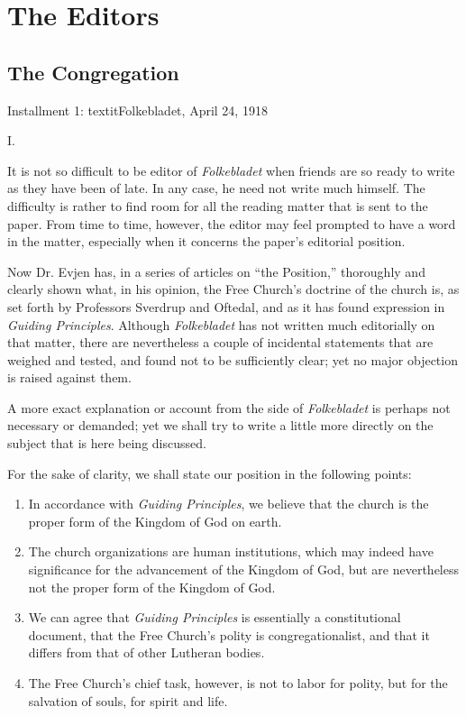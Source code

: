 

\section{The Editors}

\subsection{The Congregation}

Installment 1: 	textit{Folkebladet}, April 24, 1918


\textsc{I.}



It is not so difficult to be editor of \textit{Folkebladet} when friends are so ready to write as they have been of late. In any case, he need not write much himself. The difficulty is rather to find room for all the reading matter that is sent to the paper. From time to time, however, the editor may feel prompted to have a word in the matter, especially when it concerns the paper’s editorial position.

Now Dr. Evjen has, in a series of articles on ``the Position,'' thoroughly and clearly shown what, in his opinion, the Free Church’s doctrine of the church is, as set forth by Professors Sverdrup and Oftedal, and as it has found expression in \textit{Guiding Principles}. Although \textit{Folkebladet} has not written much editorially on that matter, there are nevertheless a couple of incidental statements that are weighed and tested, and found not to be sufficiently clear; yet no major objection is raised against them.

A more exact explanation or account from the side of \textit{Folkebladet} is perhaps not necessary or demanded; yet we shall try to write a little more directly on the subject that is here being discussed.

For the sake of clarity, we shall state our position in the following points:

\begin{enumerate}
\item In accordance with \textit{Guiding Principles}, we believe that the church is the proper form of the Kingdom of God on earth.
\item The church organizations are human institutions, which may indeed have significance for the advancement of the Kingdom of God, but are nevertheless not the proper form of the Kingdom of God.
\item We can agree that \textit{Guiding Principles} is essentially a constitutional document, that the Free Church’s polity is congregationalist, and that it differs from that of other Lutheran bodies.
\item The Free Church’s chief task, however, is not to labor for polity, but for the salvation of souls, for spirit and life.
\end{enumerate}

